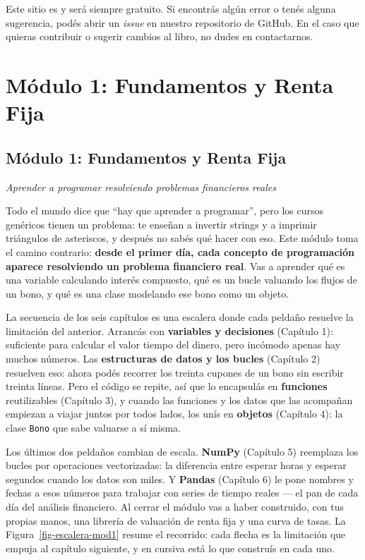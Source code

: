 \documentclass[
  spanish,
  letterpaper,
  DIV=11,
  numbers=noendperiod]{scrreprt}
\begin{document}
Este sitio es y será siempre gratuito. Si encontrás algún error o tenés
alguna sugerencia, podés abrir un \emph{issue} en nuestro repositorio de
GitHub. En el caso que quieras contribuir o sugerir cambios al libro, no
dudes en contactarnos.

\part{Módulo 1: Fundamentos y Renta Fija}

\chapter*{Módulo 1: Fundamentos y Renta
Fija}\label{muxf3dulo-1-fundamentos-y-renta-fija-1}


\emph{Aprender a programar resolviendo problemas financieros reales}

Todo el mundo dice que ``hay que aprender a programar'', pero los cursos
genéricos tienen un problema: te enseñan a invertir strings y a imprimir
triángulos de asteriscos, y después no sabés qué hacer con eso. Este
módulo toma el camino contrario: \textbf{desde el primer día, cada
concepto de programación aparece resolviendo un problema financiero
real}. Vas a aprender qué es una variable calculando interés compuesto,
qué es un bucle valuando los flujos de un bono, y qué es una clase
modelando ese bono como un objeto.

La secuencia de los seis capítulos es una escalera donde cada peldaño
resuelve la limitación del anterior. Arrancás con \textbf{variables y
decisiones} (Capítulo 1): suficiente para calcular el valor tiempo del
dinero, pero incómodo apenas hay muchos números. Las \textbf{estructuras
de datos y los bucles} (Capítulo 2) resuelven eso: ahora podés recorrer
los treinta cupones de un bono sin escribir treinta líneas. Pero el
código se repite, así que lo encapsulás en \textbf{funciones}
reutilizables (Capítulo 3), y cuando las funciones y los datos que las
acompañan empiezan a viajar juntos por todos lados, los unís en
\textbf{objetos} (Capítulo 4): la clase \texttt{Bono} que sabe valuarse
a sí misma.

Los últimos dos peldaños cambian de escala. \textbf{NumPy} (Capítulo 5)
reemplaza los bucles por operaciones vectorizadas: la diferencia entre
esperar horas y esperar segundos cuando los datos son miles. Y
\textbf{Pandas} (Capítulo 6) le pone nombres y fechas a esos números
para trabajar con series de tiempo reales --- el pan de cada día del
análisis financiero. Al cerrar el módulo vas a haber construido, con tus
propias manos, una librería de valuación de renta fija y una curva de
tasas. La Figura~\ref{fig-escalera-mod1} resume el recorrido: cada
flecha es la limitación que empuja al capítulo siguiente, y en cursiva
está lo que construís en cada uno.
\end{document}
